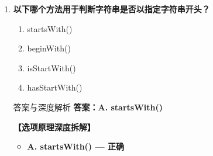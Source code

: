 \documentclass[12pt, a4paper]{ctexart}
\begin{document}
\begin{enumerate}[label=\textbf{\arabic*.}]
	      \begin{bluebox}{答案与深度解析}
		      \textbf{答案：A. substring()}

		      \textbf{【选项原理深度拆解】}
					  \begin{itemize}[label={}, leftmargin=*, nosep]


		      \item \textbf{A. substring() — 正确}
					  \begin{itemize}[label={}, nosep]
		      
			      \item substring(int beginIndex, int endIndex) 截取字符串
			      \item 注意：endIndex是Exclusive的

					  \end{itemize}
		      \item \textbf{B/C/D — 错误}
					  \begin{itemize}[label={}, nosep]
		      
			      \item 这些方法不是String类的
		      
		      

	      
					  \end{itemize}
					  \end{itemize}
\end{bluebox}

	      \vspace{1em}

	\item \textbf{以下哪个方法用于判断字符串是否以指定字符串开头？}
	      \begin{enumerate}[label=\Alph*.]
		      \item startsWith()
		      \item beginWith()
		      \item isStartWith()
		      \item hasStartWith()
	      \end{enumerate}

	      \begin{bluebox}{答案与深度解析}
		      \textbf{答案：A. startsWith()}

		      \textbf{【选项原理深度拆解】}
					  \begin{itemize}[label={}, leftmargin=*, nosep]


		      \item \textbf{A. startsWith() — 正确}
					  \begin{itemize}[label={}, nosep]
		      

\end{itemize}
\end{itemize}
\end{bluebox}
\end{enumerate}
\end{document}

